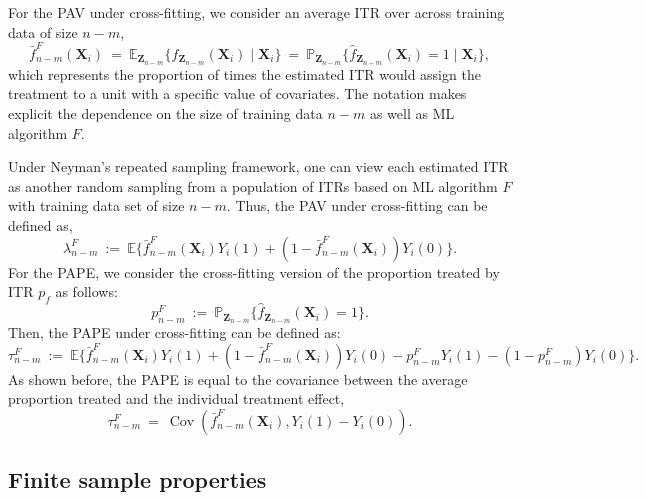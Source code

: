 \documentclass[USenglish,onecolumn]{article}
\DeclareMathOperator\Cov{Cov}
\newcommand\E{\mathbb{E}}
\newcommand\bX{\bm{X}}
\newcommand\bZ{\bm{Z}}
\begin{document}
For the PAV under cross-fitting, we consider an average ITR over
across training data of size $n-m$,
\begin{equation*}
  \bar{f}^{F}_{n-m}(\bX_i) \ = \ \E_{\bZ_{n-m}}\{\hat{f}_{\bZ_{n-m}}(\bX_i) \mid \bX_i \} \ = \ \mathbb{P}_{\bZ_{n-m}} \{\hat{f}_{\bZ_{n-m}}(\bX_i) = 1\mid \bX_i \},
\end{equation*}
which represents the proportion of times the estimated ITR would
assign the treatment to a unit with a specific value of covariates.
The notation makes explicit the dependence on the size of training
data $n-m$ as well as ML algorithm $F$.
      
Under Neyman's repeated sampling framework, one can view each
estimated ITR as another random sampling from a population of ITRs
based on ML algorithm $F$ with training data set of size $n-m$.  Thus,
the PAV under cross-fitting can be defined as,
\begin{equation*}
  \lambda^{F}_{n-m} \ := \ \E\{\bar{f}_{n-m}^{F}(\bX_i) Y_i(1) + (1-\bar{f}_{n-m}^{F}(\bX_i))Y_i(0) \}. \label{eq:PAVcv}
\end{equation*}
For the PAPE, we consider the cross-fitting version of the proportion
treated by ITR $p_f$ as follows:
 \begin{equation*}
 	p^F_{n-m} \ := \ \mathbb{P}_{\bZ_{n-m}} \{\hat{f}_{\bZ_{n-m}}(\bX_i) = 1\}.
 \end{equation*}
Then, the  PAPE under cross-fitting can be defined as: 
\begin{equation}
  \tau^{F}_{n-m} \ := \ \E\{\bar{f}_{n-m}^{F}(\bX_i) Y_i(1) + (1-\bar{f}_{n-m}^{F}(\bX_i))Y_i(0) - p_{n-m}^F Y_i(1) - (1-p_{n-m}^F) Y_i(0)\}. \label{eq:PAPEcv}
\end{equation}
As shown before, the PAPE is equal to the covariance between the
average proportion treated and the individual treatment effect, 
\begin{equation*}
	\tau^{F}_{n-m} \ = \ \Cov(\bar{f}^{F}_{n-m}(\bX_i), Y_i(1)-Y_i(0)).
\end{equation*}

\subsection{Finite sample properties}
\end{document}
